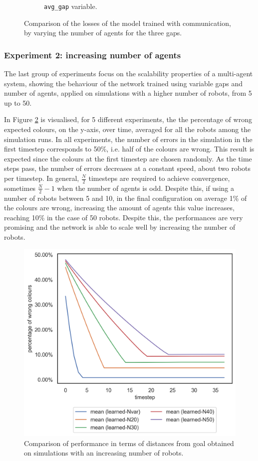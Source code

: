 \begin{figure}[!htb]
\begin{center}
\begin{subfigure}[h]{0.32\textwidth}
			\caption{\texttt{avg\_gap} variable.}
		\end{subfigure}
	\end{center}
	\vspace{-0.5cm}
	\caption[Losses summary of the second task 
	(communication).]{Comparison of the losses of the model trained with 
	communication, by varying the number of agents for the three gaps.}
	\label{fig:commlosst2}
	\vspace{-0.5cm}
\end{figure}

\subsubsection{Experiment 2: increasing number of agents}
\label{subsubsec:task2-exp-comm-2}

The last group of experiments focus on the scalability properties of a multi-agent 
system, showing the behaviour of the network trained using variable gaps and 
number of agents, applied on simulations with a higher number of robots, from 5 
up to 50.

In Figure \ref{fig:errorcomm} is visualised, for 5 different experiments, the 
the percentage of wrong expected colours, on the y-axis, over time, averaged for 
all the robots among the simulation runs. 
In all experiments, the number of errors in the simulation in the first timestep 
corresponds to 50\%, i.e. half of the colours are wrong. This result is expected 
since the colours at the first timestep are chosen randomly. As the time steps pass, 
the number of errors decreases at a constant speed, about two robots per 
timestep. In general, $\frac{N}{2}$ timesteps are required to achieve convergence, 
sometimes $\frac{N}{2} - 1$ when the number of agents is odd. 
Despite this, if using a number of robots between 5 and 10, in the final 
configuration on average 1\% of the colours are wrong, increasing the amount of 
agents this value increases, reaching 10\% in the case of 50 robots.
Despite this, the performances are very promising and the network is able to scale 
well by increasing the number of robots.
\begin{figure}[!htb]
	\centering
	\includegraphics[width=.5\textwidth]{contents/images/colours-errors-compressed}%
	\caption[Evaluation of distances from goal for a high number of 
	robots.]{Comparison of performance in terms of distances from goal obtained 
		on simulations with an increasing number of robots.}
	\label{fig:errorcomm}
\end{figure}

